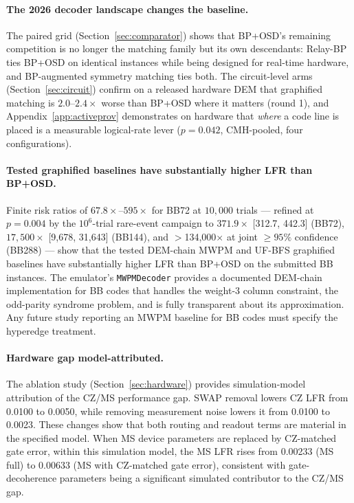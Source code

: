 \documentclass[11pt,a4paper]{article}
\begin{document}
\paragraph{The 2026 decoder landscape changes the baseline.}
The paired grid (Section~\ref{sec:comparator}) shows that BP+OSD's remaining
competition is no longer the matching family but its own descendants:
Relay-BP ties BP+OSD on identical instances while being designed for
real-time hardware, and BP-augmented symmetry matching ties both. The
circuit-level arms (Section~\ref{sec:circuit}) confirm on a released
hardware DEM that graphified matching is $2.0$--$2.4\times$ worse than
BP+OSD where it matters (round 1), and Appendix~\ref{app:activeprov}
demonstrates on hardware that \emph{where} a code line is placed is a
measurable logical-rate lever ($p=0.042$, CMH-pooled, four configurations).

\paragraph{Tested graphified baselines have substantially higher LFR than BP+OSD.}
Finite risk ratios of $67.8\times$--$595\times$ for BB72 at $10{,}000$
trials --- refined at $p=0.004$ by the $10^{6}$-trial rare-event campaign
to $371.9\times$ [312.7, 442.3] (BB72), $17{,}500\times$ [9{,}678,
31{,}643] (BB144), and $>$134{,}000$\times$ at joint $\ge95\%$ confidence (BB288) --- show that the tested DEM-chain MWPM and UF-BFS graphified baselines have substantially higher LFR than BP+OSD on the submitted BB instances.
The emulator's \texttt{MWPMDecoder} provides a documented DEM-chain implementation for BB codes that handles the weight-3 column constraint, the odd-parity syndrome problem, and is fully transparent
about its approximation.
Any future study reporting an MWPM baseline for BB codes must specify
the hyperedge treatment.

\paragraph{Hardware gap model-attributed.}
The ablation study (Section~\ref{sec:hardware}) provides simulation-model attribution of the CZ/MS performance gap.
SWAP removal lowers CZ LFR from 0.0100 to 0.0050, while removing measurement noise lowers it from 0.0100 to 0.0023.
These changes show that both routing and readout terms are material in the specified model.
When MS device parameters are replaced by CZ-matched gate error,
within this simulation model, the MS LFR rises from 0.00233 (MS full) to 0.00633
(MS with CZ-matched gate error), consistent with gate-decoherence parameters
being a significant simulated contributor to the CZ/MS gap.
\end{document}
